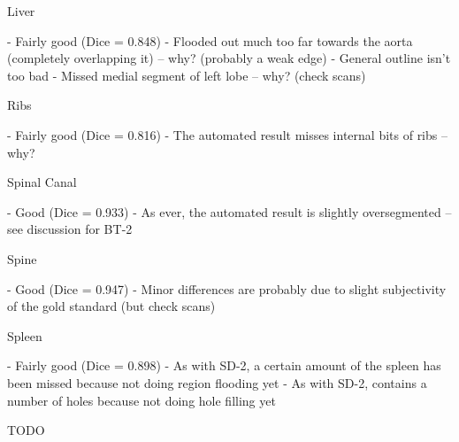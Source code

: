 Liver

- Fairly good (Dice = 0.848)
- Flooded out much too far towards the aorta (completely overlapping it) -- why? (probably a weak edge)
- General outline isn't too bad
- Missed medial segment of left lobe -- why? (check scans)

Ribs

- Fairly good (Dice = 0.816)
- The automated result misses internal bits of ribs -- why?

Spinal Canal

- Good (Dice = 0.933)
- As ever, the automated result is slightly oversegmented -- see discussion for BT-2

Spine

- Good (Dice = 0.947)
- Minor differences are probably due to slight subjectivity of the gold standard (but check scans)

Spleen

- Fairly good (Dice = 0.898)
- As with SD-2, a certain amount of the spleen has been missed because not doing region flooding yet
- As with SD-2, contains a number of holes because not doing hole filling yet

\fi

TODO

